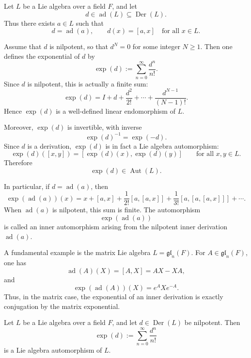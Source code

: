 \documentclass[11pt, a4paper]{report}
\begin{document}
\begin{remark}
    Let $L$ be a Lie algebra over a field $F$, and let
    \[
    d \in \operatorname{ad}(L) \subseteq \operatorname{Der}(L).
    \]
    Thus there exists $a \in L$ such that
    \[
    d=\operatorname{ad}(a), \qquad d(x)=[a,x] \quad \text{for all } x\in L.
    \]
    
    Assume that $d$ is nilpotent, so that $d^N=0$ for some integer $N\ge 1$.
    Then one defines the exponential of $d$ by
    \[
    \exp(d):=\sum_{n=0}^{\infty}\frac{d^n}{n!}.
    \]
    Since $d$ is nilpotent, this is actually a finite sum:
    \[
    \exp(d)=I+d+\frac{d^2}{2!}+\cdots+\frac{d^{N-1}}{(N-1)!}.
    \]
    Hence $\exp(d)$ is a well-defined linear endomorphism of $L$.
    
    Moreover, $\exp(d)$ is invertible, with inverse
    \[
    \exp(d)^{-1}=\exp(-d).
    \]
    Since $d$ is a derivation, $\exp(d)$ is in fact a Lie algebra automorphism:
    \[
    \exp(d)([x,y])=[\exp(d)(x),\exp(d)(y)]
    \qquad \text{for all } x,y\in L.
    \]
    Therefore
    \[
    \exp(d)\in \operatorname{Aut}(L).
    \]
    
    In particular, if $d=\operatorname{ad}(a)$, then
    \[
    \exp(\operatorname{ad}(a))(x)
    =
    x+[a,x]+\frac{1}{2!}[a,[a,x]]+\frac{1}{3!}[a,[a,[a,x]]]+\cdots.
    \]
    When $\operatorname{ad}(a)$ is nilpotent, this sum is finite. The automorphism
    \[
    \exp(\operatorname{ad}(a))
    \]
    is called an inner automorphism arising from the nilpotent inner derivation $\operatorname{ad}(a)$.
    
    A fundamental example is the matrix Lie algebra $L=\mathfrak{gl}_n(F)$. For $A\in \mathfrak{gl}_n(F)$, one has
    \[
    \operatorname{ad}(A)(X)=[A,X]=AX-XA,
    \]
    and
    \[
    \exp(\operatorname{ad}(A))(X)=e^A X e^{-A}.
    \]
    Thus, in the matrix case, the exponential of an inner derivation is exactly conjugation by the matrix exponential.
\end{remark}

\begin{proposition}
    Let $L$ be a Lie algebra over a field $F$, and let $d\in \operatorname{Der}(L)$ be nilpotent. Then
    \[
    \exp(d):=\sum_{n=0}^{\infty}\frac{d^n}{n!}
    \]
    is a Lie algebra automorphism of $L$.
    \end{proposition}
    
\end{document}
